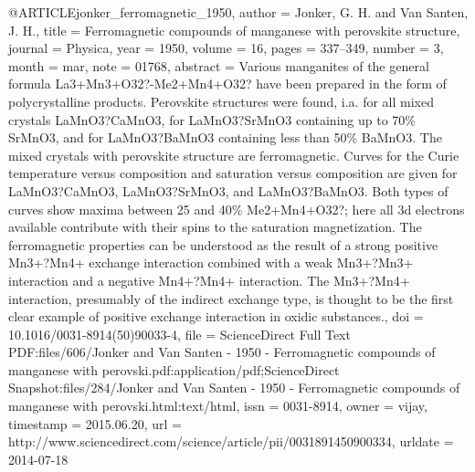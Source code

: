 @ARTICLE{jonker_ferromagnetic_1950,
  author = {Jonker, G. H. and Van Santen, J. H.},
  title = {Ferromagnetic compounds of manganese with perovskite structure},
  journal = {Physica},
  year = {1950},
  volume = {16},
  pages = {337--349},
  number = {3},
  month = mar,
  note = {01768},
  abstract = {Various manganites of the general formula La3+Mn3+O32?-Me2+Mn4+O32?
	have been prepared in the form of polycrystalline products. Perovskite
	structures were found, i.a. for all mixed crystals LaMnO3?CaMnO3,
	for LaMnO3?SrMnO3 containing up to 70\% SrMnO3, and for LaMnO3?BaMnO3
	containing less than 50\% BaMnO3. The mixed crystals with perovskite
	structure are ferromagnetic. Curves for the Curie temperature versus
	composition and saturation versus composition are given for LaMnO3?CaMnO3,
	LaMnO3?SrMnO3, and LaMnO3?BaMnO3. Both types of curves show maxima
	between 25 and 40\% Me2+Mn4+O32?; here all 3d electrons available
	contribute with their spins to the saturation magnetization. The
	ferromagnetic properties can be understood as the result of a strong
	positive Mn3+?Mn4+ exchange interaction combined with a weak Mn3+?Mn3+
	interaction and a negative Mn4+?Mn4+ interaction. The Mn3+?Mn4+ interaction,
	presumably of the indirect exchange type, is thought to be the first
	clear example of positive exchange interaction in oxidic substances.},
  doi = {10.1016/0031-8914(50)90033-4},
  file = {ScienceDirect Full Text PDF:files/606/Jonker and Van Santen - 1950 - Ferromagnetic compounds of manganese with perovski.pdf:application/pdf;ScienceDirect Snapshot:files/284/Jonker and Van Santen - 1950 - Ferromagnetic compounds of manganese with perovski.html:text/html},
  issn = {0031-8914},
  owner = {vijay},
  timestamp = {2015.06.20},
  url = {http://www.sciencedirect.com/science/article/pii/0031891450900334},
  urldate = {2014-07-18}
}

